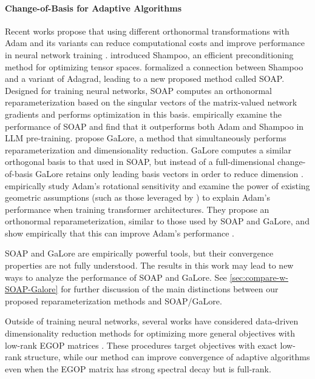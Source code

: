 \paragraph{Change-of-Basis for Adaptive Algorithms} Recent works propose that using different orthonormal transformations with Adam and its variants can reduce computational costs and improve performance in neural network training \cite{maes2024understanding,vyas2024soap,  zhao2024galore}. \citet{gupta2018shampoo} introduced Shampoo, an efficient preconditioning method for optimizing tensor spaces. \citet{vyas2024soap} formalized a connection between Shampoo and a variant of Adagrad, leading to a new proposed method called SOAP. Designed for training neural networks, SOAP computes an orthonormal reparameterization based on the singular vectors of the matrix-valued network gradients and performs optimization in this basis. \citet{vyas2024soap} empirically examine the performance of SOAP and find that it outperforms both Adam and Shampoo in LLM pre-training. \citet{zhao2024galore} propose GaLore, a method that simultaneously performs reparameterization and dimensionality reduction. GaLore computes a similar orthogonal basis to that used in SOAP, but instead of a full-dimensional change-of-basis GaLore retains only leading basis vectors in order to reduce dimension \cite{zhao2024galore}. \citet{maes2024understanding} empirically study Adam's rotational sensitivity and examine the power of existing geometric assumptions (such as those leveraged by \citet{xie2024adamexploitsellinftygeometryloss}) to explain Adam's performance when training transformer architectures. They propose an orthonormal reparameterization, similar to those used by SOAP and GaLore, and show empirically that this can improve Adam's performance \cite{maes2024understanding}. 

SOAP and GaLore are empirically powerful tools, but their convergence properties are not fully understood. The results in this work may lead to new ways to analyze the performance of SOAP and GaLore. See \cref{sec:compare-w-SOAP-Galore} for further discussion of the main distinctions between our proposed reparameterization methods and SOAP/GaLore.

Outside of training neural networks, several works have considered data-driven dimensionality reduction methods for optimizing more general objectives with low-rank EGOP matrices \cite{cartis2024learning, cosson2023low}. These procedures target objectives with exact low-rank structure, while our method can improve convergence of adaptive algorithms even when the EGOP matrix has strong spectral decay but is full-rank.

